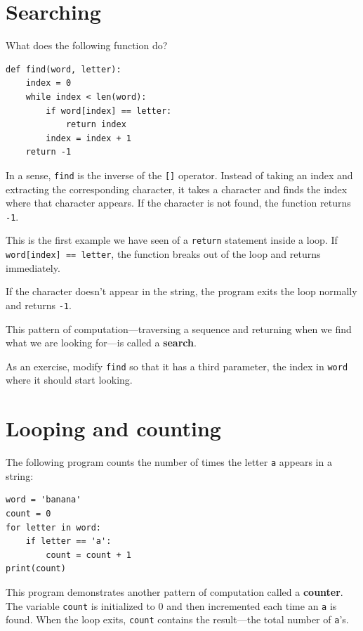 \documentclass[10pt]{book}
\begin{document}
\section{Searching}
\label{find}

What does the following function do?

\begin{verbatim}
def find(word, letter):
    index = 0
    while index < len(word):
        if word[index] == letter:
            return index
        index = index + 1
    return -1
\end{verbatim}
%
In a sense, {\tt find} is the inverse of the {\tt []} operator.
Instead of taking an index and extracting the corresponding character,
it takes a character and finds the index where that character
appears.  If the character is not found, the function returns {\tt
-1}.

This is the first example we have seen of a {\tt return} statement
inside a loop.  If {\tt word[index] == letter}, the function breaks
out of the loop and returns immediately.

If the character doesn't appear in the string, the program
exits the loop normally and  returns {\tt -1}.

This pattern of computation---traversing a sequence and returning
when we find what we are looking for---is called a {\bf search}.

As an exercise, modify {\tt find} so that it has a
third parameter, the index in {\tt word} where it should start
looking.


\section{Looping and counting}
\label{counter}

The following program counts the number of times the letter {\tt a}
appears in a string:

\begin{verbatim}
word = 'banana'
count = 0
for letter in word:
    if letter == 'a':
        count = count + 1
print(count)
\end{verbatim}
%
This program demonstrates another pattern of computation called a {\bf
counter}.  The variable {\tt count} is initialized to 0 and then
incremented each time an {\tt a} is found.
When the loop exits, {\tt count}
contains the result---the total number of {\tt a}'s.
\end{document}
